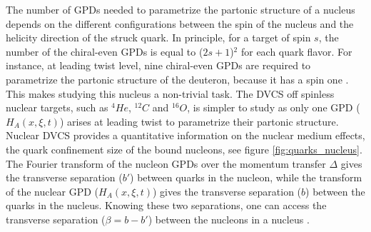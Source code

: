 The number of GPDs needed to parametrize the partonic structure of a nucleus 
depends on the different configurations between the spin of the nucleus and the 
helicity direction of the struck quark.  In principle, for a target of spin 
$s$, the number of the chiral-even GPDs is equal to ($2s+1$)$^2$ for each quark 
flavor.  For instance, at leading twist level, nine chiral-even GPDs are 
required to parametrize the partonic structure of the deuteron, because it has 
a spin one \cite{Kir, Van}.  This makes studying this nucleus a non-trivial 
task.  The DVCS off spinless nuclear targets, such as $^4He$, $^{12}C$ and 
$^{16}O$, is simpler to study as only one GPD ($H_{A}(x,\xi,t)$) arises at 
leading twist to parametrize their partonic structure.\\

 Nuclear DVCS provides a quantitative information on the nuclear medium 
 effects, the quark confinement size of the bound nucleons, see figure 
 \ref{fig:quarks_nucleus}. The Fourier transform of the nucleon GPDs over the 
 momentum transfer $\Delta$ gives the transverse separation ($b'$) between 
 quarks in the nucleon, while the transform of the nuclear GPD 
 ($H_{A}(x,\xi,t)$) gives the transverse separation ($b$) between the quarks in 
 the nucleus. Knowing these two separations, one can access the transverse 
 separation ($\beta = b - b'$) between the nucleons in a nucleus 
 \cite{EMC_simonetta}.\\
